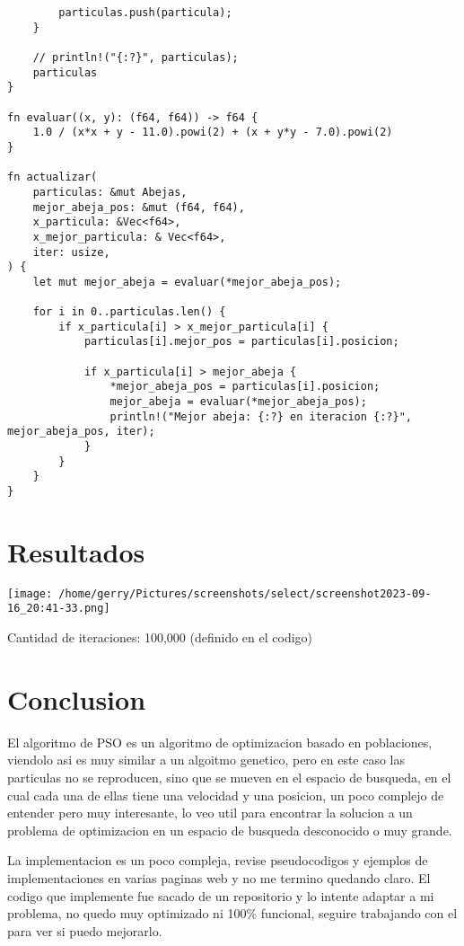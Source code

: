 \documentclass{article}
\begin{document}
\begin{verbatim}
        particulas.push(particula);
    }

    // println!("{:?}", particulas);
    particulas
}

fn evaluar((x, y): (f64, f64)) -> f64 {
    1.0 / (x*x + y - 11.0).powi(2) + (x + y*y - 7.0).powi(2)
}

fn actualizar(
    particulas: &mut Abejas,
    mejor_abeja_pos: &mut (f64, f64),
    x_particula: &Vec<f64>,
    x_mejor_particula: & Vec<f64>,
    iter: usize,
) {
    let mut mejor_abeja = evaluar(*mejor_abeja_pos);

    for i in 0..particulas.len() {
        if x_particula[i] > x_mejor_particula[i] {
            particulas[i].mejor_pos = particulas[i].posicion;

            if x_particula[i] > mejor_abeja {
                *mejor_abeja_pos = particulas[i].posicion;
                mejor_abeja = evaluar(*mejor_abeja_pos);
                println!("Mejor abeja: {:?} en iteracion {:?}", mejor_abeja_pos, iter);
            }
        }
    }
}
\end{verbatim}

\section*{Resultados}
\begin{center}
    \texttt{[image: /home/gerry/Pictures/screenshots/select/screenshot2023-09-16\_20:41-33.png]}
\end{center}

Cantidad de iteraciones: 100,000 (definido en el codigo)

\section*{Conclusion}
El algoritmo de PSO es un algoritmo de optimizacion basado en poblaciones, viendolo asi es muy similar
a un algoitmo genetico, pero en este caso las particulas no se reproducen, sino que se mueven en el
espacio de busqueda, en el cual cada una de ellas tiene una velocidad y una posicion, un poco complejo
de entender pero muy interesante, lo veo util para encontrar la solucion a un problema de optimizacion
en un espacio de busqueda desconocido o muy grande.

La implementacion es un poco compleja, revise pseudocodigos y ejemplos de implementaciones en varias
paginas web y no me termino quedando claro. El codigo que implemente fue sacado de un repositorio y lo
intente adaptar a mi problema, no quedo muy optimizado ni 100\% funcional, seguire trabajando con el para ver si puedo
mejorarlo.
\end{document}
